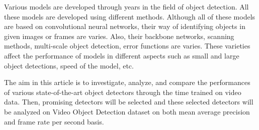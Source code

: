 \documentclass{article}
\begin{document}
\setlength{\parindent}{6ex}

\indent

Various models are developed through years in the field of object detection. 
All these models are developed using different methods. Although all of these
models are based on convolutional neural networks, their way of identifying objects
in given images or frames are varies. Also, their backbone networks, scanning methods, 
multi-scale object detection, error functions are varies. These varieties affect the 
performance of models in different aspects such as small and large object detections,
speed of the model, etc. \par

\vspace{3mm}

The aim in this article is to investigate, analyze, and compare the performances of
various state-of-the-art object detectors through the time trained on video data. Then, 
promising detectors will be selected and these selected detectors will be analyzed on
Video Object Detection dataset on both mean average precision and frame rate per second 
basis. 
\end{document}
